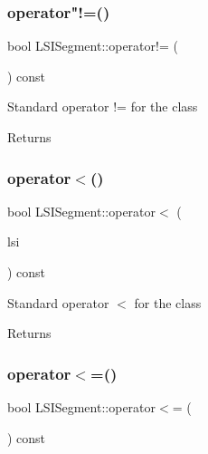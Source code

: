 \subsubsection{\texorpdfstring{operator"!=()}{operator!=()}}
{\footnotesize\ttfamily bool L\+S\+I\+Segment\+::operator!= (\begin{DoxyParamCaption}\item[{const \hyperlink{classLSISegment}{L\+S\+I\+Segment} \&}]{ }\end{DoxyParamCaption}) const}

Standard operator != for the class \begin{DoxyReturn}{Returns}

\end{DoxyReturn}
\mbox{\label{classLSISegment_a53f18d8b321d0d7aece853a24f2637ea}} 
\subsubsection{\texorpdfstring{operator$<$()}{operator<()}}
{\footnotesize\ttfamily bool L\+S\+I\+Segment\+::operator$<$ (\begin{DoxyParamCaption}\item[{const \hyperlink{classLSISegment}{L\+S\+I\+Segment} \&}]{lsi }\end{DoxyParamCaption}) const}

Standard operator $<$ for the class \begin{DoxyReturn}{Returns}

\end{DoxyReturn}
\mbox{\label{classLSISegment_a0e1d3dcc1b5ab0d446aa5f5a37891b95}} 
\subsubsection{\texorpdfstring{operator$<$=()}{operator<=()}}
{\footnotesize\ttfamily bool L\+S\+I\+Segment\+::operator$<$= (\begin{DoxyParamCaption}\item[{const \hyperlink{classLSISegment}{L\+S\+I\+Segment} \&}]{ }\end{DoxyParamCaption}) const}

